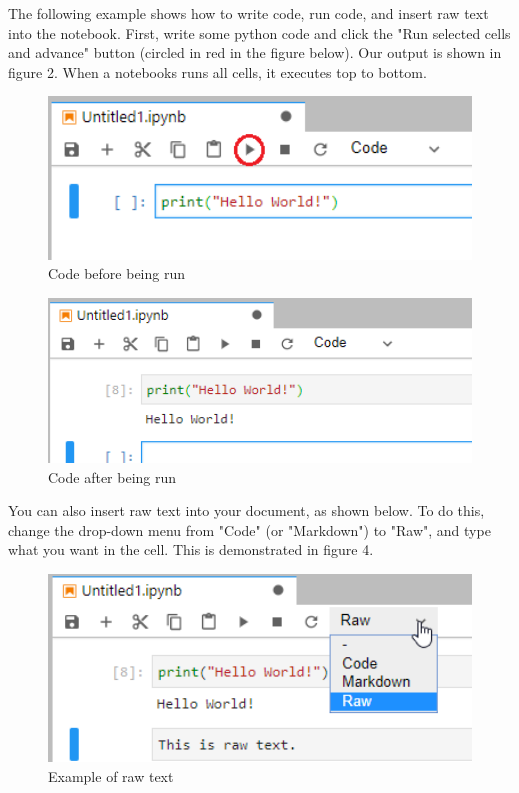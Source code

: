 \documentclass[pdftex,12pt]{artikel3}
\begin{document}
The following example shows how to write code, run code, and insert raw text into the notebook. First, write some python code and click the "Run selected cells and advance" button (circled in red in the figure below). Our output is shown in figure 2. When a notebooks runs all cells, it executes top to bottom.

\begin{figure}[h!]
    \centering
    \includegraphics[width=15cm]{code_before_running.png}
    \caption{Code before being run}
    \label{fig:codebeforerunning}
\end{figure}

\begin{figure}[h!]
    \centering
    \includegraphics[width=15cm]{code_after_running.png}
    \caption{Code after being run}
    \label{fig:codeafterrunning}
\end{figure}

You can also insert raw text into your document, as shown below.
To do this, change the drop-down menu from "Code" (or "Markdown") to "Raw", and type what you want in the cell.
This is demonstrated in figure 4.


\begin{figure}[h!]
    \centering
    \includegraphics[width=15cm]{raw_text_example.png}
    \caption{Example of raw text}
    \label{fig:rawtextexample}
\end{figure}
\end{document}
